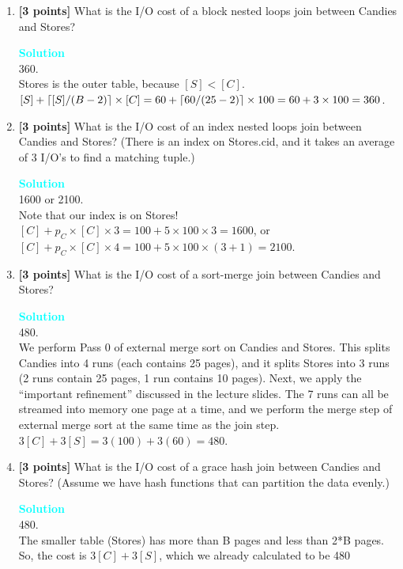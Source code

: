 \documentclass[10pt]{article}
\DeclarePairedDelimiter{\ceil}{\lceil}{\rceil}
\newenvironment{solution}
    { \begin{mdframed}[backgroundcolor=gray!10] \textcolor{cyan}{\textbf{Solution}} \\}
    {  \end{mdframed}}
\begin{document}
\begin{enumerate}
	\item \textbf{[3 points]} 
	What is the I/O cost of a block nested loops join between Candies and Stores? \\
	\begin{solution}
		360. \\
		Stores is the outer table, because $[S] < [C]$. \\
		$[S] + \ceil*{[S]/(B-2)} \times [C] = 60 + \ceil*{60/(25-2)} \times 100 = 60 + 3 \times 100 = 360$.
	\end{solution}	
	\item \textbf{[3 points]} 
	What is the I/O cost of an index nested loops join between Candies and Stores?
	(There is an index on Stores.cid, and it takes an average of 3 I/O's to find a matching tuple.) \\
	\begin{solution}
		1600 or 2100. \\
		Note that our index is on Stores! \\
		$[C] + p_C \times [C] \times 3 = 100 + 5 \times 100 \times 3 = 1600$, or \\
		$[C] + p_C \times [C] \times 4 = 100 + 5 \times 100 \times (3+1) = 2100$.
	\end{solution}	
	\item \textbf{[3 points]} 
	What is the I/O cost of a sort-merge join between Candies and Stores? \\
	\begin{solution}
		480. \\
		We perform Pass 0 of external merge sort on Candies and Stores. 
		This splits Candies into 4 runs (each contains 25 pages), and it splits Stores into 3 runs (2 runs contain 25 pages, 
		1 run contains 10 pages). Next, we apply the “important refinement” discussed in the lecture slides. 
		The 7 runs can all be streamed into memory one page at a time, and we perform the merge step of external 
		merge sort at the same time as the join step. \\
		$3[C] + 3[S] = 3(100) + 3(60) = 480$.
	\end{solution}	
	\item \textbf{[3 points]} 
	What is the I/O cost of a grace hash join between Candies and Stores?
	(Assume we have hash functions that can partition the data evenly.)
	\begin{solution}
		480. \\
		The smaller table (Stores) has more than B pages and less than 2*B pages.
		So, the cost is $3[C] + 3[S]$, which we already calculated to be 480
	\end{solution}	
\end{enumerate}
\end{document}
